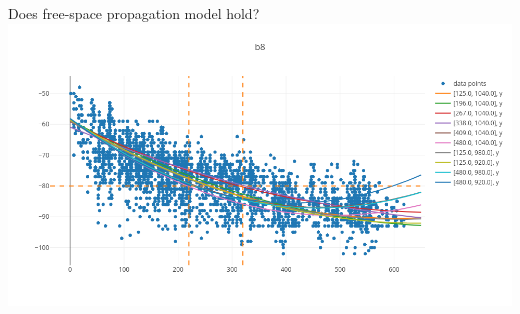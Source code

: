 \documentclass[landscape]{infslides}
\begin{document}
\begin{slide}{Does free-space propagation model hold?}
    \thispagestyle{nofooter}
\includegraphics[height=0.84\textheight,width=\textwidth]{images/different_directions.png}
\end{slide}
\end{document}
